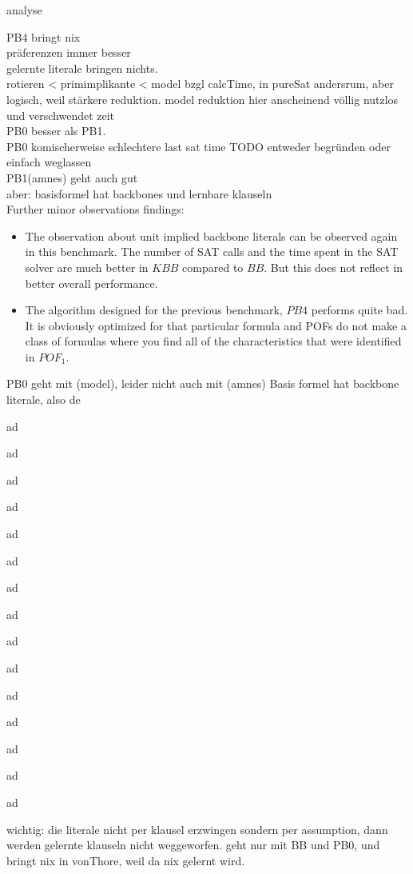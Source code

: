 analyse

PB4 bringt nix\\
präferenzen immer besser\\
gelernte literale bringen nichts.\\
rotieren < primimplikante < model bzgl calcTime, in pureSat andersrum, aber logisch, weil stärkere reduktion. model reduktion hier anscheinend völlig nutzlos und verschwendet zeit\\
PB0 besser als PB1. \\
PB0 komischerweise schlechtere last sat time TODO entweder begründen oder einfach weglassen\\
PB1(amnes) geht auch gut\\
aber: basisformel hat backbones und lernbare klauseln\\

Further minor observations findings:
\begin{itemize}
	\item The observation about unit implied backbone literals can be observed again in this benchmark. The number of SAT calls and the time spent in the SAT solver are much better in $KBB$ compared to $BB$. But this does not reflect in better overall performance.
	\item The algorithm designed for the previous benchmark, $PB4$ performs quite bad. It is obviously optimized for that particular formula and POFs do not make a class of formulas where you find all of the characteristics that were identified in $POF_1$.
\end{itemize}
PB0 geht mit (model), leider nicht auch mit (amnes)
Basis formel hat backbone literale, also de




ad

ad

ad

ad

ad

ad

ad

ad

ad

ad

ad

ad

ad

ad

ad

wichtig: die literale nicht per klausel erzwingen sondern per assumption, dann werden gelernte klauseln nicht weggeworfen. geht nur mit BB und PB0, und bringt nix in vonThore, weil da nix gelernt wird.

